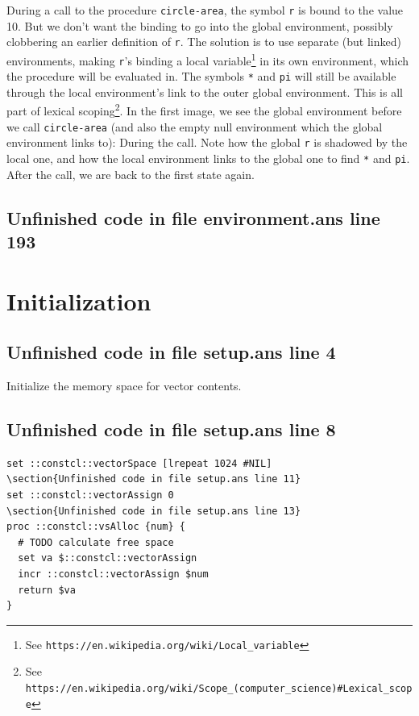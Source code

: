 \documentclass[twoside,9pt]{report}
\begin{document}
During a call to the procedure \texttt{circle-area}, the symbol \texttt{r} is bound to the value 10. But we don't want the binding to go into the global environment, possibly clobbering an earlier definition of \texttt{r}. The solution is to use separate (but linked) environments, making \texttt{r}'s binding a local variable\footnote{See \texttt{https://en.wikipedia.org/wiki/Local\_variable}} in its own environment, which the procedure will be evaluated in. The symbols \texttt{*} and \texttt{pi} will still be available through the local environment's link to the outer global environment. This is all part of lexical scoping\footnote{See \texttt{https://en.wikipedia.org/wiki/Scope\_(computer\_science)\#Lexical\_scope}}. In the first image, we see the global environment before we call \texttt{circle-area} (and also the empty null environment which the global environment links to): During the call. Note how the global \texttt{r} is shadowed by the local one, and how the local environment links to the global one to find \texttt{*} and \texttt{pi}. After the call, we are back to the first state again.

\section{Unfinished code in file environment.ans line 193}
\chapter{Initialization}
\label{initialization}
\section{Unfinished code in file setup.ans line 4}


Initialize the memory space for vector contents.

\section{Unfinished code in file setup.ans line 8}
\begin{lstlisting}
set ::constcl::vectorSpace [lrepeat 1024 #NIL]
\section{Unfinished code in file setup.ans line 11}
set ::constcl::vectorAssign 0
\section{Unfinished code in file setup.ans line 13}
proc ::constcl::vsAlloc {num} {
  # TODO calculate free space
  set va $::constcl::vectorAssign
  incr ::constcl::vectorAssign $num
  return $va
}
\end{lstlisting}
\end{document}
